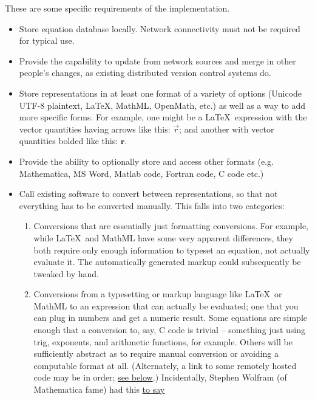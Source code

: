 \documentclass[12pt,letterpaper]{article}
\begin{document}
These are some specific requirements of the implementation.

\begin{itemize}
\item Store equation database locally. Network connectivity must not be required for typical use.
\item Provide the capability to update from network sources and merge in other people's changes,
      as existing distributed version control systems do.
\item Store representations in at least one format of a variety of options
      (Unicode UTF-8 plaintext, \LaTeX, MathML, OpenMath, etc.)
      as well as a way to add more specific forms.
      For example, one might be a \LaTeX\ expression with the vector quantities having arrows like this:
      $\vec{r}$;
      and another with vector quantities bolded like this:
      $\mathbf{r}$.
\item Provide the ability to optionally store and access other formats
      (e.g. Mathematica, MS Word, Matlab code, Fortran code, C code etc.)
\item Call existing software to convert between representations,
      so that not everything has to be converted manually.
      This falls into two categories:
      \begin{enumerate}
      \item Conversions that are essentially just formatting conversions.
            For example, while \LaTeX\ and MathML have some very apparent differences,
            they both require only enough information to typeset an equation,
            not actually evaluate it.
            The automatically generated markup could subsequently be tweaked by hand.
      \item Conversions from a typesetting or markup language like \LaTeX\ or MathML to an expression that can actually be evaluated;
            one that you can plug in numbers and get a numeric result.
            Some equations are simple enough that a conversion to, say, C code is trivial
            -- something just using trig, exponents, and arithmetic functions, for example.
            Others will be sufficiently abstract as to require manual conversion or avoiding a computable format at all.
            (Alternately, a link to some remotely hosted code may be in order;
            \hyperref[itm:linking]{see below}.)
            Incidentally, Stephen Wolfram (of Mathematica fame) had this
            \href{http://www.stephenwolfram.com/publications/recent/mathml/mathml1.html}{to say}

\end{enumerate}
\end{itemize}
\end{document}
